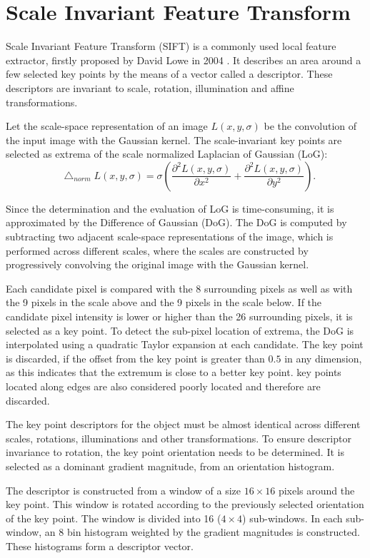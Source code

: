 \documentclass{aip-cp}
\newcommand*\Laplace{\mathop{}\!\mathbin\bigtriangleup}
\begin{document}
\section{Scale Invariant Feature Transform}
Scale Invariant Feature Transform (SIFT) is a commonly used local feature extractor, firstly proposed by David Lowe in 2004 \cite{Lowe2004}. It describes an area around a few selected key points by the means of a vector called a descriptor. These descriptors are invariant to scale, rotation, illumination and affine transformations.

Let the scale-space representation of an image $L(x,y,\sigma)$ be the convolution of the input image with the Gaussian kernel. The scale-invariant key points are selected as extrema of the scale normalized Laplacian of Gaussian (LoG):
\begin{equation}
    \Laplace_{norm} L(x, y, \sigma) = \sigma \left(\frac{\partial^2 L(x,y,\sigma)}{\partial x^2} + \frac{\partial^2 L(x,y,\sigma)}{\partial y^2}\right).
\end{equation}

Since the determination and the evaluation of LoG is time-consuming, it is approximated by the Difference of Gaussian (DoG). The DoG is computed by subtracting two adjacent scale-space representations of the image, which is performed across different scales, where the scales are constructed by progressively convolving the original image with the Gaussian kernel.

Each candidate pixel is compared with the 8 surrounding pixels as well as with the 9 pixels in the scale above and the 9 pixels in the scale below. If the candidate pixel intensity is lower or higher than the 26 surrounding pixels, it is selected as a key point. To detect the sub-pixel location of extrema, the DoG is interpolated using a quadratic Taylor expansion at each candidate. The key point is discarded, if the offset from the key point is greater than $0.5$ in any dimension, as this indicates that the extremum is close to a better key point. key points located along edges are also considered poorly located and therefore are discarded.

The key point descriptors for the object must be almost identical across different scales, rotations, illuminations and other transformations. To ensure descriptor invariance to rotation, the key point orientation needs to be determined. It is selected as a dominant gradient magnitude, from an orientation histogram.

The descriptor is constructed from a window of a size $16 \times 16$ pixels around the key point. This window is rotated according to the previously selected orientation of the key point. The window is divided into 16 ($4 \times 4$) sub-windows. In each sub-window, an $8$ bin histogram weighted by the gradient magnitudes is constructed. These histograms form a descriptor vector.
\end{document}
